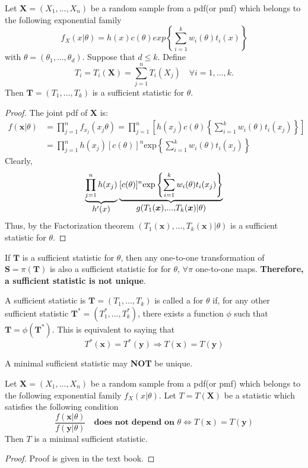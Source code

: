 \begin{theorem}
    Let $\boldsymbol{X} = (X_1,...,X_n)$ be a random sample from a pdf(or pmf) which belongs to the following exponential family
    $$
    f_X(x|\theta) = h(x)c(\theta)exp 
    \left \{ 
    \sum_{i=1}^{k}w_i(\theta)t_i(x)
    \right \}
    $$
    with $\theta = (\theta_1,...,\theta_d)$. Suppose that $d \leq k$. Define 
    $$T_i = T_i(\boldsymbol{X}) = \sum_{j=1}^{n}T_i(X_j)
    \quad \forall i=1,...,k.$$
    Then $\boldsymbol{T} = (T_1,...,T_k)$ is a sufficient statistic for $\theta$.
\end{theorem}
\begin{proof}
    The joint pdf of $\boldsymbol{X}$ is:
    \begin{align*}
    f(\boldsymbol{x}|\theta) & = 
    \prod_{j=1}^{n}f_{x_j}(x_j \theta) 
    = \prod_{j=1}^{n} \left[
    h(x_j)c(\theta) \left \{
    \sum_{i=1}^{k}w_i(\theta)t_i(x_j)
    \right\}
    \right ] \\
    & = \prod_{j=1}^{n}h(x_j)[c(\theta)]^n \mathrm{exp} \left \{
    \sum_{i=1}^{k}w_i(\theta)t_i(x_j)
    \right\}
    \end{align*}
    Clearly, 
    $$
    \underbrace{ \prod_{j=1}^{n}h(x_j)}_{ \Large h'(x)}
    \underbrace{[c(\theta)]^n\mathrm{exp} \left \{
    \sum_{i=1}^{k}w_i(\theta)t_i(x_j)
    \right\}}_{\Large g(T_1(\boldsymbol{x}),...,T_k(\boldsymbol{x})|\theta)}
    $$
    Thus, by the Factorization theorem $(T_1(\boldsymbol{x}),...,T_k(\boldsymbol{x})|\theta)$ is a sufficient statistic for $\theta$.
\end{proof}
 If $\boldsymbol{T}$ is a sufficient statistic for $\theta$, then any one-to-one transformation of $\boldsymbol{S} = \pi(\boldsymbol{T})$ is also a sufficient statistic for for $\theta$, $\forall \pi$ one-to-one maps. \textbf{Therefore, a sufficient statistic is not unique}. 
\begin{definition}
    A sufficient statistic is $\boldsymbol{T} = (T_1,...,T_k)$ is called a  for $\theta$ if, for any other sufficient statistic $\boldsymbol{T}^* = (T_1^*,...,T_k^*)$, there exists a function $\phi$ such that $\boldsymbol{T} = \phi(\boldsymbol{T}^*)$. This is equivalent to saying that
    $$
    T^*(\boldsymbol{x}) = T^*(\boldsymbol{y}) \Longrightarrow T(\boldsymbol{x}) = T(\boldsymbol{y})
    $$
\end{definition}
 A minimal sufficient statistic may \textbf{NOT} be unique.
\begin{theorem}
    Let $\boldsymbol{X} = (X_1,...,X_n)$ be a random sample from a pdf(or pmf) which belongs to the following exponential family $f_X(x|\theta)$. Let $T = T(\boldsymbol{X})$ be a statistic which satisfies the following condition
    $$
    \frac{f(\boldsymbol{x}|\theta)}{f(\boldsymbol{y}|\theta)}\quad \textbf{does not depend on } \theta
    \iff T(\boldsymbol{x}) =  T(\boldsymbol{y})
    $$
    Then $T$ is a minimal sufficient statistic. 
\end{theorem}
\begin{proof}
    Proof is given in the text book.
\end{proof}